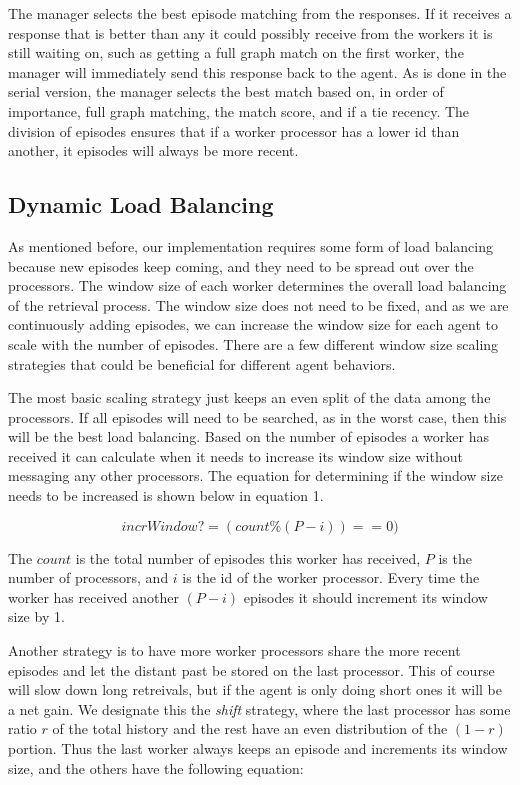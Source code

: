 \documentclass[11pt]{article} %
\begin{document}
The manager selects the best episode matching from the responses. If it receives
a response that is better than any it could possibly receive from the workers it
is still waiting on, such as getting a full graph match on the first worker, the
manager will immediately send this response back to the agent. As is done in the
serial version, the manager selects the best match based on, in order of
importance, full graph matching, the match score, and if a tie recency. The
division of episodes ensures that if a worker processor has a lower id than
another, it episodes will always be more recent.

\subsection{Dynamic Load Balancing}

As mentioned before, our implementation requires some form of load balancing
because new episodes keep coming, and they need to be spread out over
the processors. The window size of each worker determines the overall load balancing of the
retrieval process. The window size does not need to be fixed, and as we are
continuously adding episodes, we can increase the window size for each agent to
scale with the number of episodes. There are a few different window size scaling
strategies that could be beneficial for different agent behaviors.

The most basic scaling strategy just keeps an even split of the data among the
processors. If all episodes will need to be searched, as in the worst case, then
this will be the best load balancing. Based on the number of episodes a worker
has received it can calculate when it needs to increase its window size without
messaging any other processors. The equation for determining if the window size
needs to be increased is shown below in equation 1.

\begin{equation}
incrWindow? = (count  \% (P - i )) == 0)
\end{equation}

The $count$ is the total number of episodes this worker has received, $P$ is the
number of processors, and $i$ is the id of the worker processor. Every time the
worker has received another $ (P-i) $ episodes it should increment its window
size by 1.

Another strategy is to have more worker processors share the more recent episodes
and let the distant past be stored on the last processor. This of course will slow down
long retreivals, but if the agent is only doing short ones it will be a net gain. We designate 
this the \emph{shift} strategy, where the last processor has some ratio $r$ of the total
history and the rest have an even distribution of the $(1-r)$ portion. Thus the 
last worker always keeps an episode and increments its window size, and the others 
have the following equation: 
\end{document}
